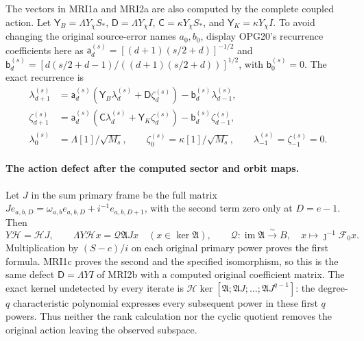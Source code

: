 \documentclass[11pt,a4paper]{article}
\begin{document}
The vectors in MRI1a and MRI2a are also computed by the complete
coupled action. Let $\mathsf Y_B=\Lambda Y_\chi S_*$,
$\mathsf D=\Lambda Y_\chi I$, $\mathsf C=\kappa Y_\chi S_*$,
and $\mathsf Y_K=\kappa Y_\chi I$. To avoid changing the
original source-error names $a_0,b_0$, display OPG20's recurrence
coefficients here as
$\mathsf a_d^{(s)}=[(d+1)(s/2+d)]^{-1/2}$ and
$\mathsf b_d^{(s)}=[d(s/2+d-1)/((d+1)(s/2+d))]^{1/2}$,
with $\mathsf b_0^{(s)}=0$. The exact recurrence is
\[
\begin{split}
 \lambda_{d+1}^{(s)}
 &=\mathsf a_d^{(s)}(\mathsf Y_B\lambda_d^{(s)}
                         +\mathsf D\zeta_d^{(s)})
                           -\mathsf b_d^{(s)}\lambda_{d-1}^{(s)},\\
 \zeta_{d+1}^{(s)}
 &=\mathsf a_d^{(s)}(\mathsf C\lambda_d^{(s)}
                         +\mathsf Y_K\zeta_d^{(s)})
                           -\mathsf b_d^{(s)}\zeta_{d-1}^{(s)},\\
 \lambda_0^{(s)}&=\Lambda[1]/\sqrt{M_s},\qquad
 \zeta_0^{(s)}=\kappa[1]/\sqrt{M_s},\qquad
 \lambda_{-1}^{(s)}=\zeta_{-1}^{(s)}=0.
\end{split}\tag{MRI2b}
\]

\paragraph{The action defect after the computed sector and orbit maps.}
Let $J$ in the sum primary frame be the full matrix
$Je_{a,b,D}=\omega_{a,b}e_{a,b,D}+i^{-1}e_{a,b,D+1}$,
with the second term zero only at $D=e-1$. Then
\[
 Y\mathcal H=\mathcal HJ,\qquad
 \Lambda Y\mathcal Hx=\mathcal Q\mathfrak AJx\quad
 (x\in\ker\mathfrak A),\qquad
 \mathcal Q:\operatorname{im}\mathfrak A\xrightarrow{\sim}B,
 \quad x\mapsto\jmath^{-1}\mathcal F_0x.
 \tag{MRI2c}
\]
Multiplication by $(S-c)/i$ on each original primary power
proves the first formula. MRI1c proves the second and the
specified isomorphism, so this is the same defect
$\mathsf D=\Lambda YI$ of MRI2b with a computed original
coefficient matrix. The exact kernel undetected by every
iterate is $\mathcal H\ker[\mathfrak A;\mathfrak AJ;\ldots;
\mathfrak AJ^{q-1}]$: the degree-$q$ characteristic polynomial
expresses every subsequent power in these first $q$ powers.
Thus neither the rank calculation nor the cyclic quotient
removes the original action leaving the observed subspace.
\end{document}
